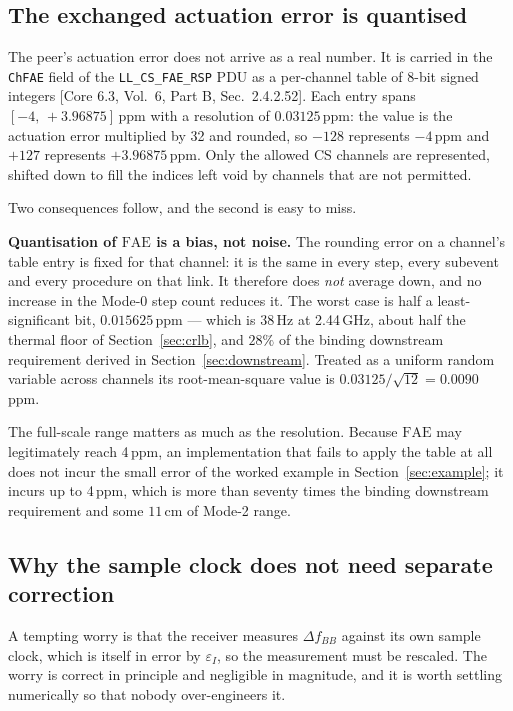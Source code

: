 \documentclass[11pt,a4paper]{article}
\newcommand{\FAE}{\mathrm{FAE}}
\newcommand{\code}[1]{\texttt{\small #1}}
\newcommand{\core}[1]{\textcolor{rulegrey}{\small[Core 6.3, #1]}}
\begin{document}
\subsection{The exchanged actuation error is quantised}
\label{sec:faequant}

The peer's actuation error does not arrive as a real number. It is carried in the \code{ChFAE} field
of the \code{LL\_CS\_FAE\_RSP} PDU as a per-channel table of 8-bit signed integers
\core{Vol.\ 6, Part B, Sec.\ 2.4.2.52}. Each entry spans $[-4,\,+3.96875]$\,ppm with a resolution of
$0.03125$\,ppm: the value is the actuation error multiplied by 32 and rounded, so $-128$ represents
$-4$\,ppm and $+127$ represents $+3.96875$\,ppm. Only the allowed CS channels are represented, shifted
down to fill the indices left void by channels that are not permitted.

Two consequences follow, and the second is easy to miss.

\begin{callout}
\textbf{Quantisation of $\FAE$ is a bias, not noise.} The rounding error on a channel's table entry is
fixed for that channel: it is the same in every step, every subevent and every procedure on that link.
It therefore does \emph{not} average down, and no increase in the Mode-0 step count reduces it. The
worst case is half a least-significant bit, $0.015625$\,ppm --- which is $38$\,Hz at 2.44\,GHz, about
half the thermal floor of Section~\ref{sec:crlb}, and $28\%$ of the binding downstream requirement
derived in Section~\ref{sec:downstream}. Treated as a uniform random variable across channels its
root-mean-square value is $0.03125/\sqrt{12} = 0.0090$\,ppm.
\end{callout}

The full-scale range matters as much as the resolution. Because $\FAE$ may legitimately reach 4\,ppm,
an implementation that fails to apply the table at all does not incur the small error of the worked
example in Section~\ref{sec:example}; it incurs up to 4\,ppm, which is more than seventy times the
binding downstream requirement and some $11$\,cm of Mode-2 range.

\subsection{Why the sample clock does not need separate correction}

A tempting worry is that the receiver measures $\Delta f_{BB}$ against its own sample clock, which is
itself in error by $\varepsilon_I$, so the measurement must be rescaled. The worry is correct in
principle and negligible in magnitude, and it is worth settling numerically so that nobody
over-engineers it.
\end{document}
